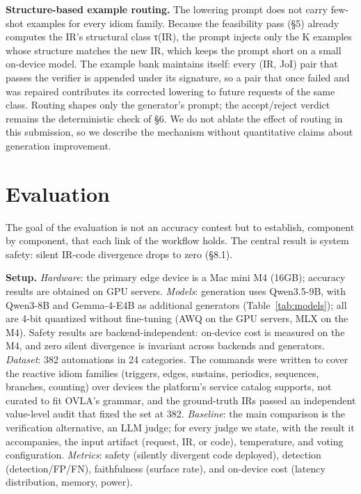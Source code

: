 \documentclass[sigconf,nonacm,anonymous,review]{acmart}
\begin{document}
\textbf{Structure-based example routing.} The lowering prompt does not carry few-shot examples for every idiom family. Because the feasibility pass (\S5) already computes the IR's structural class τ(IR), the prompt injects only the K examples whose structure matches the new IR, which keeps the prompt short on a small on-device model. The example bank maintains itself: every (IR, JoI) pair that passes the verifier is appended under its signature, so a pair that once failed and was repaired contributes its corrected lowering to future requests of the same class. Routing shapes only the generator's prompt; the accept/reject verdict remains the deterministic check of \S6. We do not ablate the effect of routing in this submission, so we describe the mechanism without quantitative claims about generation improvement.

\section{Evaluation}

The goal of the evaluation is not an accuracy contest but to establish, component by component, that each link of the workflow holds. The central result is system safety: silent IR-code divergence drops to zero (\S8.1).

\textbf{Setup.} \emph{Hardware}: the primary edge device is a Mac mini M4 (16GB); accuracy results are obtained on GPU servers. \emph{Models}: generation uses Qwen3.5-9B, with Qwen3-8B and Gemma-4-E4B as additional generators (Table~\ref{tab:models}); all are 4-bit quantized without fine-tuning (AWQ on the GPU servers, MLX on the M4). Safety results are backend-independent: on-device cost is measured on the M4, and zero silent divergence is invariant across backends and generators. \emph{Dataset}: 382 automations in 24 categories. The commands were written to cover the reactive idiom families (triggers, edges, sustains, periodics, sequences, branches, counting) over devices the platform's service catalog supports, not curated to fit OVLA's grammar, and the ground-truth IRs passed an independent value-level audit that fixed the set at 382. \emph{Baseline}: the main comparison is the verification alternative, an LLM judge; for every judge we state, with the result it accompanies, the input artifact (request, IR, or code), temperature, and voting configuration. \emph{Metrics}: safety (silently divergent code deployed), detection (detection/FP/FN), faithfulness (surface rate), and on-device cost (latency distribution, memory, power).
\end{document}
